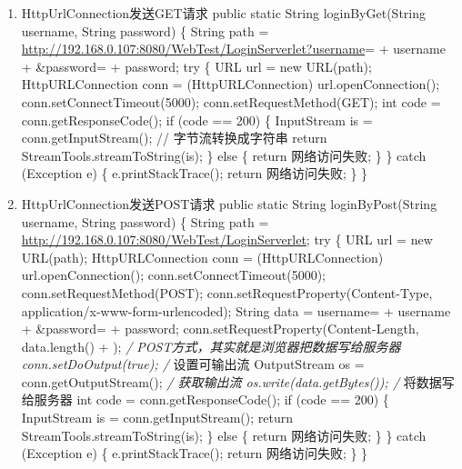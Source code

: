 \documentclass[9pt, b5paper]{article}
\begin{document}
\begin{enumerate}
\item HttpUrlConnection发送GET请求
\label{sec-7-0-6-1}
public static String loginByGet(String username, String password) \{
        String path = \url{http://192.168.0.107:8080/WebTest/LoginServerlet?username}= + username + \&password= + password;
        try \{
            URL url = new URL(path);
            HttpURLConnection conn = (HttpURLConnection) url.openConnection();
            conn.setConnectTimeout(5000);
            conn.setRequestMethod(GET);
            int code = conn.getResponseCode();
            if (code == 200) \{
                InputStream is = conn.getInputStream(); // 字节流转换成字符串
                return StreamTools.streamToString(is);
            \} else \{
                return 网络访问失败;
            \}
        \} catch (Exception e) \{
            e.printStackTrace();
            return 网络访问失败;
        \}
    \}
\item HttpUrlConnection发送POST请求
\label{sec-7-0-6-2}
public static String loginByPost(String username, String password) \{
        String path = \url{http://192.168.0.107:8080/WebTest/LoginServerlet};
        try \{
            URL url = new URL(path);
            HttpURLConnection conn = (HttpURLConnection) url.openConnection();
            conn.setConnectTimeout(5000);
            conn.setRequestMethod(POST);
            conn.setRequestProperty(Content-Type, application/x-www-form-urlencoded);
            String data = username= + username + \&password= + password;
            conn.setRequestProperty(Content-Length, data.length() + );
            \emph{/ POST方式，其实就是浏览器把数据写给服务器
            conn.setDoOutput(true); /} 设置可输出流
            OutputStream os = conn.getOutputStream(); \emph{/ 获取输出流
            os.write(data.getBytes()); /} 将数据写给服务器
            int code = conn.getResponseCode();
            if (code == 200) \{
                InputStream is = conn.getInputStream();
                return StreamTools.streamToString(is);
            \} else \{
                return 网络访问失败;
            \}
        \} catch (Exception e) \{
            e.printStackTrace();
            return 网络访问失败;
        \}
    \}
\end{enumerate}
\end{document}
